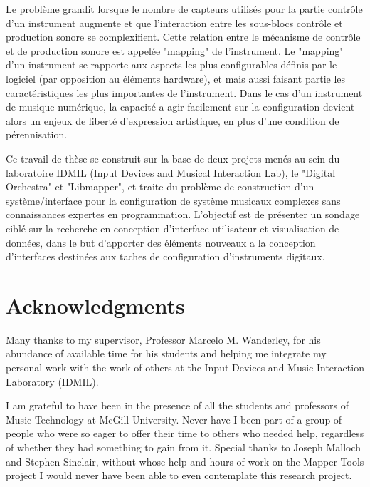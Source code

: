 \documentclass [12pt,letterpaper]{report}
\begin{document}
Le probl\`{e}me grandit lorsque le nombre de capteurs utilis\'{e}s pour la partie contr\^{o}le d'un instrument augmente et que l'interaction entre les sous-blocs contr\^{o}le et production sonore se complexifient. Cette relation entre le m\'{e}canisme de contr\^{o}le et de production sonore est appel\'{e}e "mapping" de l'instrument. Le "mapping" d'un instrument se rapporte aux aspects les plus configurables d\'{e}finis par le logiciel (par opposition au \'{e}l\'{e}ments hardware), et mais aussi faisant partie les caract\'{e}ristiques les plus importantes de l'instrument. Dans le cas d'un instrument de musique num\'{e}rique, la capacit\'{e} a agir facilement sur la configuration devient alors un enjeux de libert\'{e} d'expression artistique, en plus d'une condition de p\'{e}rennisation.

Ce travail de th\`{e}se se construit sur la base de deux projets men\'{e}s au sein du laboratoire IDMIL (Input Devices and Musical Interaction Lab), le "Digital Orchestra" et "Libmapper", et traite du probl\`{e}me de construction d'un syst\`{e}me/interface pour la configuration de syst\`{e}me musicaux complexes sans connaissances expertes en programmation. L'objectif est de pr\'{e}senter un sondage cibl\'{e} sur la recherche en conception d'interface utilisateur et visualisation de donn\'{e}es, dans le but d'apporter des \'{e}l\'{e}ments nouveaux a la conception d'interfaces destin\'{e}es aux taches de configuration d'instruments digitaux.

\newpage

\section*{\centering Acknowledgments}

Many thanks to my supervisor, Professor Marcelo M. Wanderley, for his abundance of available time for his students and helping me integrate my personal work with the work of others at the Input Devices and Music Interaction Laboratory (IDMIL).

I am grateful to have been in the presence of all the students and professors of Music Technology at McGill University. Never have I been part of a group of people who were so eager to offer their time to others who needed help, regardless of whether they had something to gain from it. Special thanks to Joseph Malloch and Stephen Sinclair, without whose help and hours of work on the Mapper Tools project I would never have been able to even contemplate this research project.
\end{document}
